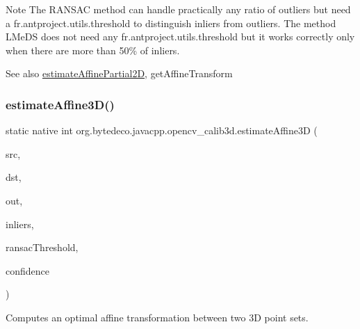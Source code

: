 \begin{DoxyNote}{Note}
The R\+A\+N\+S\+AC method can handle practically any ratio of outliers but need a fr.antproject.utils.threshold to distinguish inliers from outliers. The method L\+Me\+DS does not need any fr.antproject.utils.threshold but it works correctly only when there are more than 50\% of inliers.
\end{DoxyNote}
\begin{DoxySeeAlso}{See also}
\hyperlink{group__calib3d_gab4e1d79cab0ae6448de411f9688836c8}{estimate\+Affine\+Partial2D}, get\+Affine\+Transform 
\end{DoxySeeAlso}
\mbox{\label{group__calib3d_ga07eb86fa8ee181d1695f57b6b93955cd}} 
\subsubsection{\texorpdfstring{estimate\+Affine3\+D()}{estimateAffine3D()}}
{\footnotesize\ttfamily static native int org.\+bytedeco.\+javacpp.\+opencv\+\_\+calib3d.\+estimate\+Affine3D (\begin{DoxyParamCaption}\item[{@By\+Val Mat}]{src,  }\item[{@By\+Val Mat}]{dst,  }\item[{@By\+Val Mat}]{out,  }\item[{@By\+Val Mat}]{inliers,  }\item[{double}]{ransac\+Threshold,  }\item[{double}]{confidence }\end{DoxyParamCaption})\hspace{0.3cm}{\ttfamily [static]}}



Computes an optimal affine transformation between two 3D point sets. 


